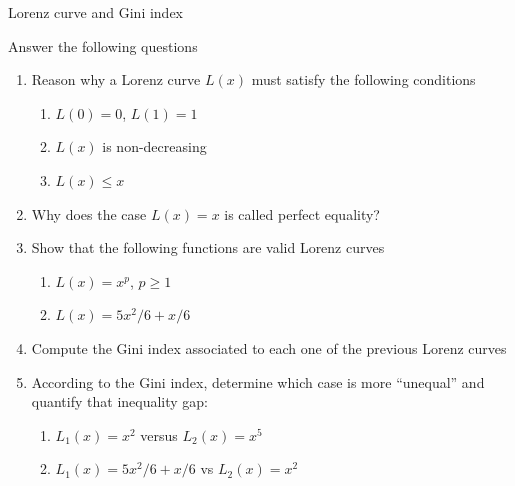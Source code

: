 \documentclass[9pt]{beamer}
\begin{document}
\begin{frame}{Lorenz curve and Gini index}

    Answer the following questions
    \begin{enumerate}[leftmargin = 0.5cm, label = \arabic*., rightmargin = 0.2cm]
        \item Reason why a Lorenz curve $L(x)$ must satisfy the following conditions
        \begin{enumerate}[leftmargin = 0.5cm, label = (\alph*), rightmargin = 0.2cm]
            \item $L(0) = 0$, $L(1) = 1$
            \item $L(x)$ is non-decreasing
            \item $L(x) \leq x$
        \end{enumerate}
        \item Why does the case $L(x) = x$ is called perfect equality?
        \item Show that the following functions are valid Lorenz curves
        \begin{enumerate}[leftmargin = 0.5cm, label = (\alph*), rightmargin = 0.2cm]
            \item $L(x) = x^p$, $p \geq 1$
            \item $L(x) = 5x^2/6 + x/6$
        \end{enumerate}
        \item Compute the Gini index associated to each one of the previous Lorenz curves
        \item According to the Gini index, determine which case is more ``unequal'' and quantify that inequality gap:
        \begin{enumerate}[leftmargin = 0.5cm, label = (\alph*), rightmargin = 0.2cm]
            \item $L_1(x) = x^2$ versus $L_2(x) = x^5$
            \item $L_1(x) = 5x^2/6 + x/6$ vs $L_2(x) = x^2$
        \end{enumerate}
    \end{enumerate}
\end{frame}
\end{document}
